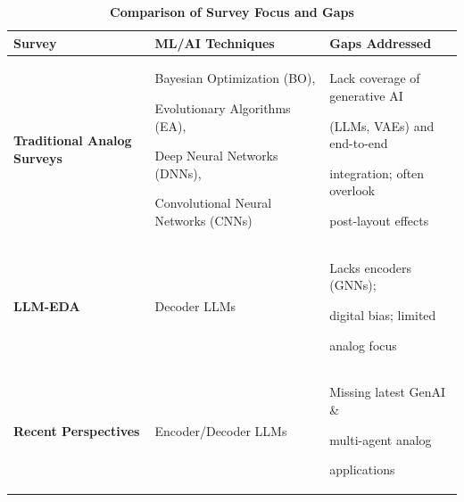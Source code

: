 \documentclass{ieeeaccess}
\begin{document}
\begin{table}[h!]
	\caption{\textbf{Comparison of Survey Focus and Gaps}}
	\label{tab:survey_comparison}
	\setlength{\tabcolsep}{3pt}
	\begin{tabular}{|p{35pt}|p{75pt}|p{105pt}|}
		\hline
		\textbf{Survey}                                                                                                                            & \textbf{ML/AI Techniques} & \textbf{Gaps Addressed} \\
		\hline
		\textbf{Traditional Analog Surveys}                                                                                                        &
		Bayesian Optimization (BO), \par Evolutionary Algorithms (EA), \par Deep Neural Networks (DNNs), \par Convolutional Neural Networks (CNNs) &
		Lack coverage of generative AI \par (LLMs, VAEs) and end-to-end \par integration; often overlook \par post-layout effects                                                                        \\
		\hline
		\textbf{LLM-EDA}                                                                                                                           &
		Decoder LLMs                                                                                                                               &
		Lacks encoders (GNNs); \par digital bias; limited \par analog focus                                                                                                                              \\
		\hline
		\textbf{Recent Perspectives}                                                                                                               &
		Encoder/Decoder LLMs                                                                                                                       &
		Missing latest GenAI \& \par multi-agent analog \par applications                                                                                                                                \\
		\hline
	\end{tabular}
\end{table}
\end{document}
